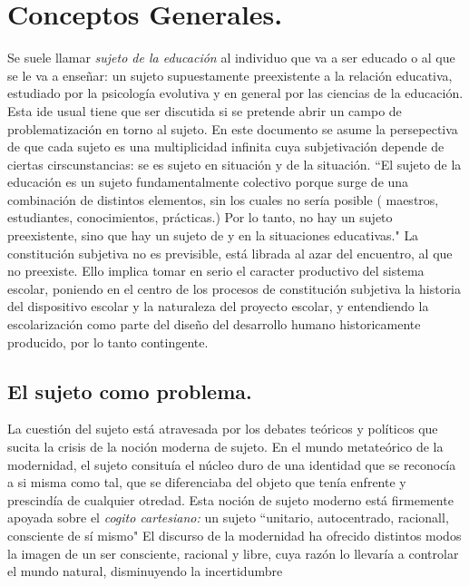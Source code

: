 \documentclass[a4paper,12pt,spanish]{book}
\begin{document}
\chapter {Conceptos Generales.}


Se suele llamar \textit{sujeto de la educación} al individuo que va a ser educado o al que se le va a enseñar:
un sujeto supuestamente preexistente a la relación educativa, estudiado por la psicología evolutiva y 
en general por las ciencias de la educación. Esta ide usual tiene que ser discutida si se pretende abrir un 
campo de problematización en torno al sujeto. En este documento se asume la persepectiva de que cada sujeto 
es una multiplicidad infinita cuya subjetivación depende de ciertas cirscunstancias: se es sujeto en situación y 
de la situación. ``El sujeto de la educación es un sujeto fundamentalmente colectivo porque surge de una combinación 
de distintos elementos, sin los cuales no sería posible ( maestros, estudiantes, conocimientos, prácticas.) Por lo 
tanto, no hay un sujeto preexistente, sino que hay un sujeto de y en la situaciones educativas." \citep{cerletti2008}  La constitución 
subjetiva no es previsible, está librada al azar del encuentro, al que no preexiste. Ello implica tomar en serio el 
caracter productivo del sistema escolar, poniendo en el centro de los procesos de constitución subjetiva la historia 
del dispositivo escolar y la naturaleza del proyecto escolar, y entendiendo la escolarización como parte del diseño del 
desarrollo humano historicamente producido, por lo tanto contingente.

\section {El sujeto como problema.}

La cuestión del sujeto está atravesada por los debates teóricos y políticos que sucita la crisis de la noción
moderna de sujeto. En el mundo metateórico de la modernidad, el sujeto consituía el núcleo duro de una identidad que 
se reconocía a si misma como tal, que se diferenciaba del objeto que tenía enfrente y prescindía de cualquier otredad. Esta 
noción de sujeto moderno está firmemente apoyada sobre el \textit{cogito cartesiano:} un sujeto ``unitario, autocentrado,
racionall, consciente de sí mismo" \citep{pineau1999}
El discurso de la modernidad ha ofrecido distintos modos la imagen de un ser consciente, racional y libre,
cuya razón lo llevaría a controlar el mundo natural, disminuyendo la incertidumbre \citep{beck2006}
\end{document}

